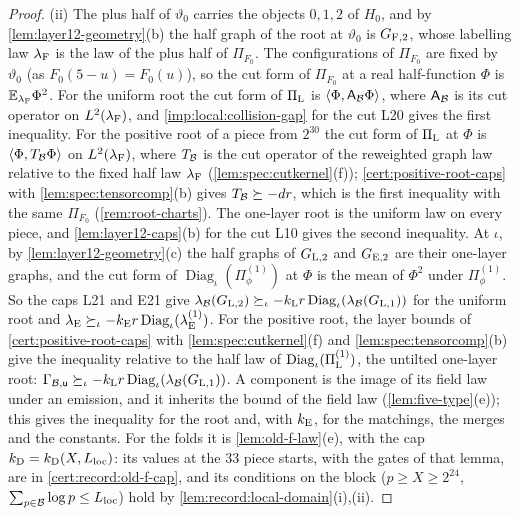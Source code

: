 \begin{proof}
(ii) The plus half of $\vartheta_0$ carries the objects $0,1,2$ of $H_0$, and
by \cref{lem:layer12-geometry}(b) the half graph of the root at $\vartheta_0$
is $G_{\rm F,2}$, whose labelling law $\lambda_{\rm F}$ is the law of the plus
half of $\Pi_{F_0}$. The configurations of $\Pi_{F_0}$ are fixed by
$\vartheta_0$ (as $F_0(5-u)=F_0(u)$), so the cut form of $\Pi_{F_0}$ at a real
half-function $\Phi$ is $\mathbb E_{\lambda_{\rm F}}\Phi^2$. For the uniform root the
cut form of $\Pi_{\rm L}$ is $\left\langle \Phi,\mathsf A_{\mathcal B}\Phi\right\rangle$, where $\mathsf A_{\mathcal B}$ is its cut operator on $L^2(\lambda_{\rm F})$, and
\cref{imp:local:collision-gap} for the cut L20 gives the first inequality. For the
positive root of a piece from $2^{30}$ the cut form of $\Pi_{\rm L}$ at $\Phi$
is $\left\langle \Phi,T_{\mathcal B}\Phi\right\rangle$ on $L^2(\lambda_{\rm F})$, where $T_{\mathcal B}$ is the
cut operator of the reweighted graph law relative to the fixed half law
$\lambda_{\rm F}$ (\cref{lem:spec:cutkernel}(f)); \cref{cert:positive-root-caps}
with \cref{lem:spec:tensorcomp}(b) gives $T_{\mathcal B}\succeq-dr$, which is the
first inequality with the same $\Pi_{F_0}$ (\cref{rem:root-charts}). The
one-layer root is the uniform law on every piece, and
\cref{lem:layer12-caps}(b) for the cut L10 gives the second inequality. At
$\iota$, by \cref{lem:layer12-geometry}(c) the half graphs of $G_{\rm L,2}$ and
$G_{\rm E,2}$ are their one-layer graphs, and the cut form of
$\operatorname{Diag}_\iota(\Pi^{(1)}_\phi)$ at $\Phi$ is the mean of $\Phi^2$
under $\Pi^{(1)}_\phi$. So the caps L21 and E21 give
$\lambda_{\mathcal B}(G_{\rm L,2})\succeq_\iota-k_{\rm L}r\operatorname{Diag}_\iota(\lambda_{\mathcal B}(G_{\rm L,1}))$
for the uniform root and
$\lambda_{\rm E}\succeq_\iota-k_{\rm E}r\operatorname{Diag}_\iota(\lambda^{(1)}_{\rm E})$.
For the positive root, the layer bounds of \cref{cert:positive-root-caps} with
\cref{lem:spec:cutkernel}(f) and \cref{lem:spec:tensorcomp}(b) give the
inequality relative to the half law of
$\operatorname{Diag}_\iota(\Pi^{(1)}_{\rm L})$, the untilted one-layer root:
$\Gamma_{\mathcal B,\mathsf u}\succeq_\iota
-k_{\rm L}r\operatorname{Diag}_\iota(\lambda_{\mathcal B}(G_{\rm L,1}))$.
A component is the image of its field law under an emission, and it inherits
the bound of the field law (\cref{lem:five-type}(e)); this gives the
inequality for the root and, with $k_{\rm E}$, for the matchings, the merges
and the constants. For the folds it is \cref{lem:old-f-law}(e), with the cap
$k_{\rm D}=k_{\rm D}(X,L_{\rm loc})$: its values at the $33$ piece starts,
with the gates of that lemma, are in \cref{cert:record:old-f-cap}, and its
conditions on the block ($p\ge X\ge2^{24}$,
$\sum_{p\in\mathcal B}\log p\le L_{\rm loc}$) hold by
\cref{lem:record:local-domain}(i),(ii).


\end{proof}

